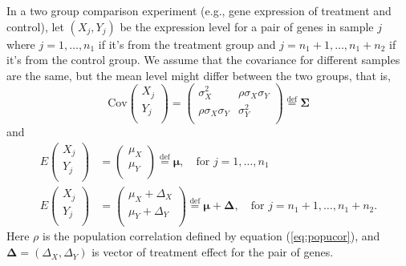 \documentclass[12pt, a4paper]{article}
\newcommand{\cov}{\text{Cov}}
\begin{document}
	In a two group comparison experiment (e.g., gene expression of treatment and control), let $(X_j, Y_j)$ be the expression level for a pair of genes in sample $j$ where $j=1, \ldots, n_1$ if it's from the treatment group and $j=n_1 + 1, \ldots, n_1 + n_2$ if it's from the control group. We assume that the covariance for different samples are the same, but the mean level might differ between the two groups, that is,  
	\begin{equation}\label{eq:covstruct}
		\cov\left(\begin{array}{c}
			X_j\\
			Y_j\\	
		\end{array} \right)	
		= \left(
		\begin{array}{cc}
		\sigma_X^2 &\rho \sigma_X\sigma_Y \\
		\rho \sigma_X \sigma_Y & 	\sigma_Y^2 \\
		\end{array} 
		\right)
		\stackrel{\text{def}}{=} \bm \Sigma 
	\end{equation}
	and 
	\begin{equation}\label{eq:meanstruct}
	\begin{aligned}
	E  \left(\begin{array}{c}
	X_j\\
	Y_j\\	
	\end{array} \right) 
	& = 	\left(\begin{array}{c}
	\mu_X\\
	\mu_Y\\
	\end{array} \right)\stackrel{\text{def}}{=} \bm \mu,  \text{~~ for $j = 1, \ldots, n_1$} \\
	E  \left(\begin{array}{c}
	X_j\\
	Y_j\\	
	\end{array} \right) 
	&= 	\left(\begin{array}{c}
	\mu_X + \Delta_X\\
	\mu_Y + \Delta_Y\\
	\end{array} \right)\stackrel{\text{def}}{=} \bm \mu + \bm \Delta,  \text{~~ for $j = n_1 + 1, \ldots, n_1+ n_2$}.	
	\end{aligned}	
	\end{equation}
	Here $\rho$ is the population correlation defined by equation (\ref{eq:popucor}), and $\bm \Delta= (\Delta_X, \Delta_Y)$ is vector of treatment effect for the pair of genes.
\end{document}
